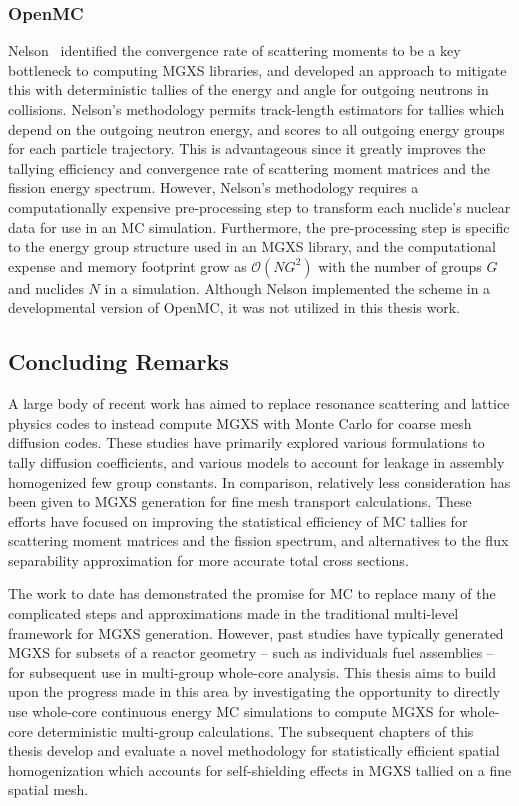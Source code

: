 \subsubsection{OpenMC}
\label{subsec:chap3-lit-review-transport-openmc}

Nelson~\cite{nelson2014improved} identified the convergence rate of scattering moments to be a key bottleneck to computing \ac{MGXS} libraries, and developed an approach to mitigate this with deterministic tallies of the energy and angle for outgoing neutrons in collisions. Nelson's methodology permits track-length estimators for tallies which depend on the outgoing neutron energy, and scores to all outgoing energy groups for each particle trajectory. This is advantageous since it greatly improves the tallying efficiency and convergence rate of scattering moment matrices and the fission energy spectrum. However, Nelson's methodology requires a computationally expensive pre-processing step to transform each nuclide's nuclear data for use in an \ac{MC} simulation. Furthermore, the pre-processing step is specific to the energy group structure used in an \ac{MGXS} library, and the computational expense and memory footprint grow as $\mathcal{O}(NG^{2})$ with the number of groups $G$ and nuclides $N$ in a simulation. Although Nelson implemented the scheme in a developmental version of OpenMC, it was not utilized in this thesis work.

\subsection{Concluding Remarks}
\label{subsec:chap3-lit-review-conclusion}

A large body of recent work has aimed to replace resonance scattering and lattice physics codes to instead compute \ac{MGXS} with Monte Carlo for coarse mesh diffusion codes. These studies have primarily explored various formulations to tally diffusion coefficients, and various models to account for leakage in assembly homogenized few group constants. In comparison, relatively less consideration has been given to \ac{MGXS} generation for fine mesh transport calculations. These efforts have focused on improving the statistical efficiency of \ac{MC} tallies for scattering moment matrices and the fission spectrum, and alternatives to the flux separability approximation for more accurate total cross sections. 

The work to date has demonstrated the promise for \ac{MC} to replace many of the complicated steps and approximations made in the traditional multi-level framework for \ac{MGXS} generation. However, past studies have typically generated \ac{MGXS} for subsets of a reactor geometry -- such as individuals fuel assemblies -- for subsequent use in multi-group whole-core analysis. This thesis aims to build upon the progress made in this area by investigating the opportunity to directly use whole-core continuous energy \ac{MC} simulations to compute \ac{MGXS} for whole-core deterministic multi-group calculations. The subsequent chapters of this thesis develop and evaluate a novel methodology for statistically efficient spatial homogenization which accounts for self-shielding effects in \ac{MGXS} tallied on a fine spatial mesh.

